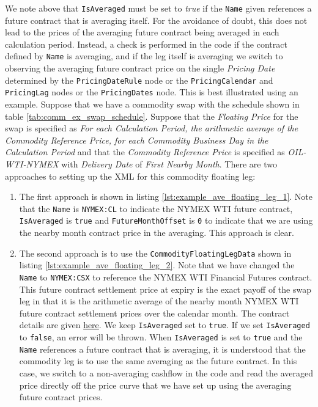 We note above that \lstinline!IsAveraged! must be set to \emph{true}  if the \lstinline!Name! given references a future contract that is averaging itself. For the avoidance of doubt, this does not lead to the prices of the averaging future contract being averaged in each calculation period. Instead, a check is performed in the code if the contract defined by \lstinline!Name! is averaging, and if the leg itself is averaging we switch to observing the averaging future contract price on the single \textit{Pricing Date} determined by the \lstinline!PricingDateRule! node or the \lstinline!PricingCalendar! and \lstinline!PricingLag! nodes or the \lstinline!PricingDates! node. This is best illustrated using an example. Suppose that we have a commodity swap with the schedule shown in table \ref{tab:comm_ex_swap_schedule}. Suppose that the \textit{Floating Price} for the swap is specified as \textit{For each Calculation Period, the arithmetic average of the Commodity Reference Price, for each Commodity Business Day in the Calculation Period} and that the \textit{Commodity Reference Price} is specified as \textit{OIL-WTI-NYMEX} with \textit{Delivery Date} of \textit{First Nearby Month}. There are two approaches to setting up the XML for this commodity floating leg:
\begin{enumerate}

\item
The first approach is shown in listing \ref{lst:example_ave_floating_leg_1}. Note that the \lstinline!Name! is \lstinline!NYMEX:CL! to indicate the NYMEX WTI future contract, \lstinline!IsAveraged! is \lstinline!true! and \lstinline!FutureMonthOffset! is \lstinline!0! to indicate that we are using the nearby month contract price in the averaging. This approach is clear.

\item
The second approach is to use the \lstinline!CommodityFloatingLegData! shown in listing \ref{lst:example_ave_floating_leg_2}. Note that we have changed the \lstinline!Name! to \lstinline!NYMEX:CSX! to reference the NYMEX WTI Financial Futures contract. This future contract settlement price at expiry is the exact payoff of the swap leg in that it is the arithmetic average of the nearby month NYMEX WTI future contract settlement prices over the calendar month. The contract details are given \href{https://www.cmegroup.com/trading/energy/crude-oil/west-texas-intermediate-wti-crude-oil-calendar-swap-futures_contract_specifications.html}{here}. We keep \lstinline!IsAveraged! set to \lstinline!true!. If we set \lstinline!IsAveraged! to \lstinline!false!, an error will be thrown. When \lstinline!IsAveraged! is set to \lstinline!true! and the \lstinline!Name! references a future contract that is averaging, it is understood that the commodity leg is to use the same averaging as the future contract. In this case, we switch to a non-averaging cashflow in the code and read the averaged price directly off the price curve that we have set up using the averaging future contract prices.

\end{enumerate}

